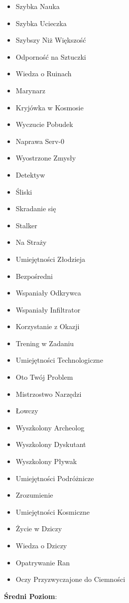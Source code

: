 \begin{itemize}
\item Szybka Nauka
\item Szybka Ucieczka
\item Szybszy Niż Większość
\item Odporność na Sztuczki
\item Wiedza o Ruinach
\item Marynarz
\item Kryjówka w Kosmosie
\item Wyczucie Pobudek
\item Naprawa Serv-0
\item Wyostrzone Zmysły
\item Detektyw
\item Śliski
\item Skradanie się
\item Stalker
\item Na Straży
\item Umiejętności Złodzieja
\item Bezpośredni 
\item Wspaniały Odkrywca
\item Wspaniały Infiltrator
\item Korzystanie z Okazji
\item Trening w Zadaniu
\item Umiejętności Technologiczne
\item Oto Twój Problem
\item Mistrzostwo Narzędzi
\item Łowczy
\item Wyszkolony Archeolog
\item Wyszkolony Dyskutant
\item Wyszkolony Pływak
\item Umiejętności Podróżnicze
\item Zrozumienie
\item Umiejętności Kosmiczne
\item Życie w Dziczy
\item Wiedza o Dziczy
\item Opatrywanie Ran
\item Oczy Przyzwyczajone do Ciemności
\end{itemize}

\textbf{Średni Poziom}:


